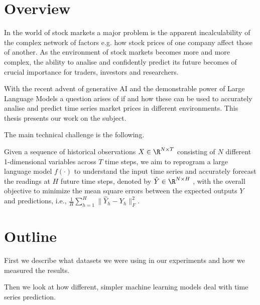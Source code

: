 \section{Overview}
In the world of stock markets a major problem is the apparent incalculability of the complex network of factors e.g. how stock prices of one company affect those of another. As the environment of stock markets becomes more and more complex, the ability to analise and confidently predict its future becomes of crucial importance for traders, investors and researchers.

With the recent advent of generative AI and the demonstrable power of Large Language Models a question arises of if and how these can be used to accurately analise and predict time series market prices in different environments. This thesis presents our work on the subject.

The main technical challenge is the following.

Given a sequence of historical observations \(X \in \R^{N\times T}\)
consisting of \(N\) different 1-dimensional variables across \(T\) time steps, we aim to reprogram a large
language model \(f(\cdot)\) to understand the input time series and accurately forecast the readings at \(H\) future time steps, denoted by \(\hat{Y} \in \R^{N\times H}\) , with the overall objective to minimize the mean square errors between the expected outputs \(Y\) and predictions, i.e., \(\frac1H \sum_{h=1}^H \| \hat{Y}_h - Y_h \|_F^2 \). \cite{reprogramming_llm}

\section{Outline} %
First we describe what datasets we were using in our experiments and how we measured the results.

Then we look at how different, simpler machine learning models deal with time series prediction.



